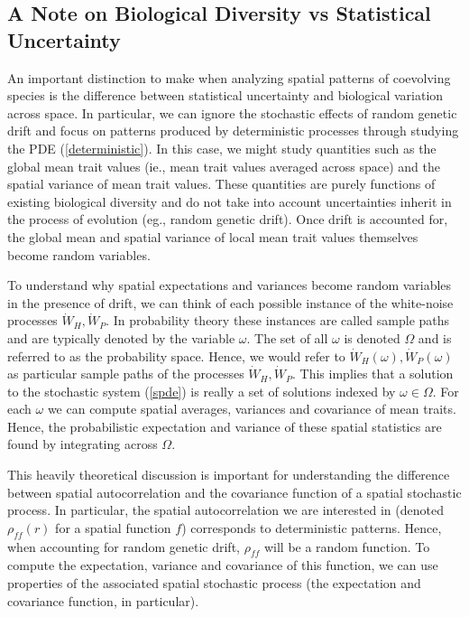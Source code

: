 \documentclass{article}
\begin{document}
\hypertarget{a-note-on-biological-diversity-vs-statistical-uncertainty}{%
\subsection{A Note on Biological Diversity vs Statistical
Uncertainty}\label{a-note-on-biological-diversity-vs-statistical-uncertainty}}

An important distinction to make when analyzing spatial patterns of
coevolving species is the difference between statistical uncertainty and
biological variation across space. In particular, we can ignore the
stochastic effects of random genetic drift and focus on patterns
produced by deterministic processes through studying the PDE
(\ref{deterministic}). In this case, we might study quantities such as
the global mean trait values (ie., mean trait values averaged across
space) and the spatial variance of mean trait values. These quantities
are purely functions of existing biological diversity and do not take
into account uncertainties inherit in the process of evolution (eg.,
random genetic drift). Once drift is accounted for, the global mean and
spatial variance of local mean trait values themselves become random
variables.

To understand why spatial expectations and variances become random
variables in the presence of drift, we can think of each possible
instance of the white-noise processes \(\dot W_H,\dot W_P\). In
probability theory these instances are called sample paths and are
typically denoted by the variable \(\omega\). The set of all \(\omega\)
is denoted \(\Omega\) and is referred to as the probability space.
Hence, we would refer to \(\dot W_H(\omega),\dot W_P(\omega)\) as
particular sample paths of the processes \(\dot W_H,\dot W_P\). This
implies that a solution to the stochastic system (\ref{spde}) is really
a set of solutions indexed by \(\omega\in\Omega\). For each \(\omega\)
we can compute spatial averages, variances and covariance of mean
traits. Hence, the probabilistic expectation and variance of these
spatial statistics are found by integrating across \(\Omega\).

This heavily theoretical discussion is important for understanding the
difference between spatial autocorrelation and the covariance function
of a spatial stochastic process. In particular, the spatial
autocorrelation we are interested in (denoted \(\rho_{ff}(r)\) for a
spatial function \(f\)) corresponds to deterministic patterns. Hence,
when accounting for random genetic drift, \(\rho_{ff}\) will be a random
function. To compute the expectation, variance and covariance of this
function, we can use properties of the associated spatial stochastic
process (the expectation and covariance function, in particular).
\end{document}
